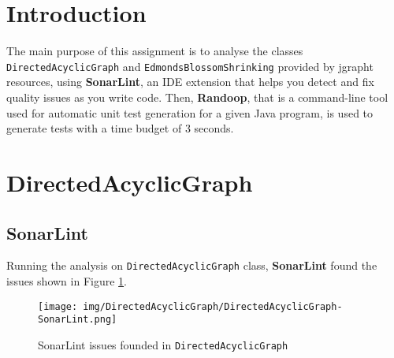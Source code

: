 \documentclass[a4paper,12pt]{article} %
\begin{document}
	\thispagestyle{empty}  
	\vspace{0.4cm}
	
	\section{Introduction}
	The main purpose of this assignment is to analyse the classes \texttt{DirectedAcyclicGraph} and \texttt{EdmondsBlossomShrinking} provided by jgrapht resources, using \textbf{SonarLint}, an IDE extension that helps you detect and fix quality issues as you write code. Then, \textbf{Randoop}, that is a command-line tool used for automatic unit test generation for a given Java program, is used to generate tests with a time budget of 3 seconds.
	
	\section{DirectedAcyclicGraph}
	
	\subsection*{SonarLint}
	Running the analysis on \texttt{DirectedAcyclicGraph} class, \textbf{SonarLint} found the issues shown in Figure \ref{fig:sonar-graph}.
	
	\begin{figure}[H]
		\centering
		\texttt{[image: img/DirectedAcyclicGraph/DirectedAcyclicGraph-SonarLint.png]}	
		\caption{SonarLint issues founded in \texttt{DirectedAcyclicGraph}}
		\label{fig:sonar-graph}
	\end{figure}
\end{document}
